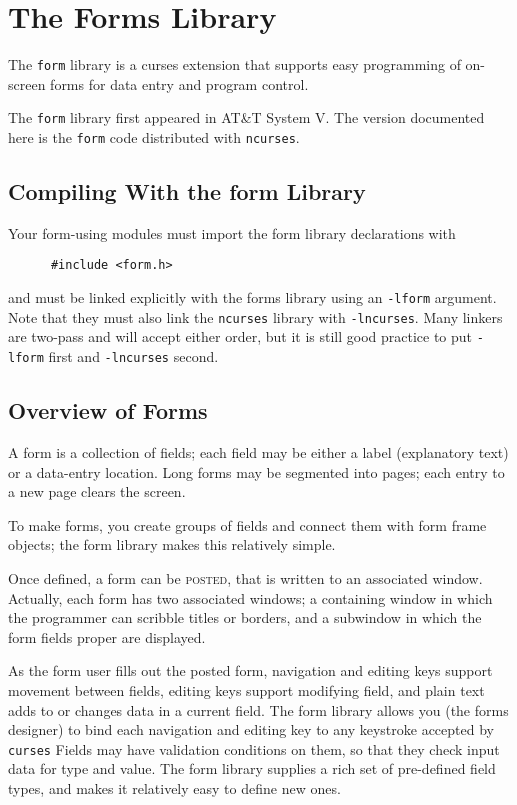 \chapter{The Forms Library}

\label{f0:form}The \texttt{form} library is a curses extension that supports easy
programming of on-screen forms for data entry and program control. 

The \texttt{form} library first appeared in AT\&T System V.  The
version documented here is the \texttt{form} code distributed
with \texttt{ncurses}.

\section{Compiling With the form Library}

\label{f0:fcompile}Your form-using modules must import the form library declarations with
\begin{verbatim} 	  #include <form.h>
\end{verbatim}
and must be linked explicitly with the forms library using an
\texttt{-lform} argument.  Note that they must also link the
\texttt{ncurses} library with \texttt{-lncurses}.  Many linkers
are two-pass and will accept either order, but it is still good practice
to put \texttt{-lform} first and \texttt{-lncurses} second.

\section{Overview of Forms}

\label{f0:foverview}A form is a collection of fields; each field may be either a label
(explanatory text) or a data-entry location.  Long forms may be
segmented into pages; each entry to a new page clears the screen. 

To make forms, you create groups of fields and connect them with form
frame objects; the form library makes this relatively simple. 

Once defined, a form can be \textsc{posted}, that is written to an
associated window.  Actually, each form has two associated windows; a
containing window in which the programmer can scribble titles or
borders, and a subwindow in which the form fields proper are displayed. 

As the form user fills out the posted form, navigation and editing
keys support movement between fields, editing keys support modifying
field, and plain text adds to or changes data in a current field.  The
form library allows you (the forms designer) to bind each navigation
and editing key to any keystroke accepted by \texttt{curses}
Fields may have validation conditions on them, so that they check input
data for type and value.  The form library supplies a rich set of
pre-defined field types, and makes it relatively easy to define new ones. 


